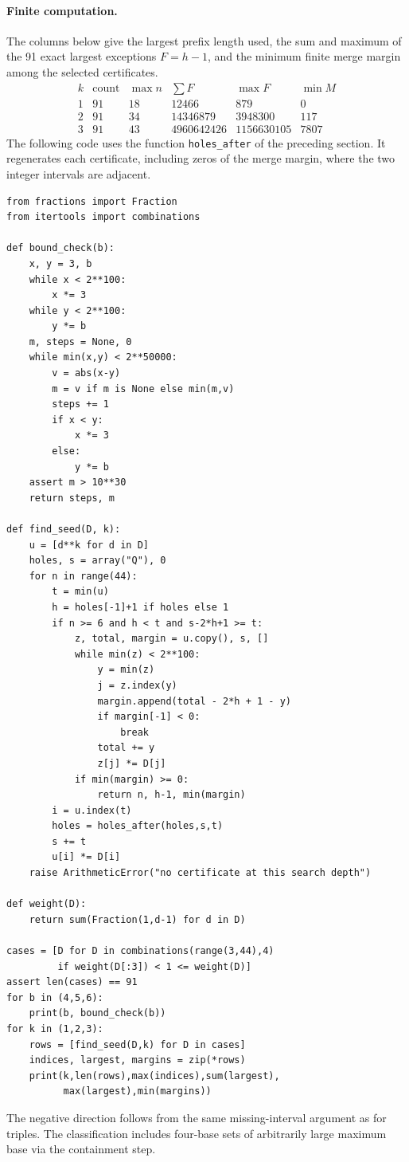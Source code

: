 \documentclass[11pt]{article}
\begin{document}
\paragraph{Finite computation.}
The columns below give the largest prefix length used, the sum and
maximum of the 91 exact largest exceptions $F=h-1$, and the minimum
finite merge margin among the selected certificates.
\[
\begin{array}{r|r|r|r|r|r}
 k &\text{count}&\max n &\sum F&\max F&\min M\\ \hline
 1&91&18&12466&879&0\\
 2&91&34&14346879&3948300&117\\
 3&91&43&4960642426&1156630105&7807
\end{array}
\]
The following code uses the function \texttt{holes\_after} of the
preceding section. It regenerates each certificate, including zeros
of the merge margin, where the two integer intervals are adjacent.
{\small\begin{verbatim}
from fractions import Fraction
from itertools import combinations

def bound_check(b):
    x, y = 3, b
    while x < 2**100:
        x *= 3
    while y < 2**100:
        y *= b
    m, steps = None, 0
    while min(x,y) < 2**50000:
        v = abs(x-y)
        m = v if m is None else min(m,v)
        steps += 1
        if x < y:
            x *= 3
        else:
            y *= b
    assert m > 10**30
    return steps, m

def find_seed(D, k):
    u = [d**k for d in D]
    holes, s = array("Q"), 0
    for n in range(44):
        t = min(u)
        h = holes[-1]+1 if holes else 1
        if n >= 6 and h < t and s-2*h+1 >= t:
            z, total, margin = u.copy(), s, []
            while min(z) < 2**100:
                y = min(z)
                j = z.index(y)
                margin.append(total - 2*h + 1 - y)
                if margin[-1] < 0:
                    break
                total += y
                z[j] *= D[j]
            if min(margin) >= 0:
                return n, h-1, min(margin)
        i = u.index(t)
        holes = holes_after(holes,s,t)
        s += t
        u[i] *= D[i]
    raise ArithmeticError("no certificate at this search depth")

def weight(D):
    return sum(Fraction(1,d-1) for d in D)

cases = [D for D in combinations(range(3,44),4)
         if weight(D[:3]) < 1 <= weight(D)]
assert len(cases) == 91
for b in (4,5,6):
    print(b, bound_check(b))
for k in (1,2,3):
    rows = [find_seed(D,k) for D in cases]
    indices, largest, margins = zip(*rows)
    print(k,len(rows),max(indices),sum(largest),
          max(largest),min(margins))
\end{verbatim}}
The negative direction follows from the same missing-interval argument
as for triples. The classification includes four-base sets of
arbitrarily large maximum base via the containment step.
\end{document}
